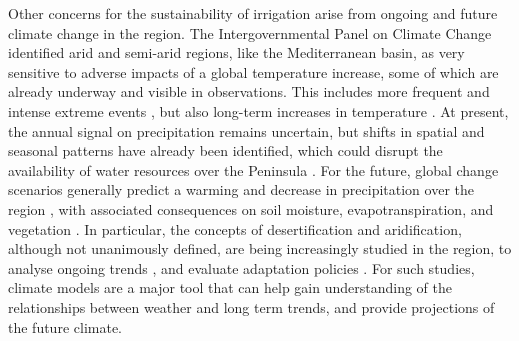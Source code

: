 Other concerns for the sustainability of irrigation arise from ongoing and future climate change in the region. The Intergovernmental Panel on Climate Change 
\citep{RN1} identified arid and semi-arid regions, like the Mediterranean basin, as very sensitive to adverse impacts of a global temperature increase, some of which are already underway and visible in observations.
This includes more frequent and intense extreme events \citep{dominguez-castro_high_2019}, but also long-term increases in temperature \citep{pena-angulo_seasonal_2021,gonzalez-hidalgo_variability_2022}. At present, the annual signal on precipitation remains uncertain, but shifts in spatial and seasonal patterns have already been identified, which could disrupt the availability of water resources over the Peninsula \citep{gonzalez-hidalgo_seasonal_2024}. 
For the future, global change scenarios generally predict a warming and decrease in precipitation over the region \citep{pereira_temperature_2021}, with associated consequences on soil moisture, evapotranspiration, and vegetation \citep{RN1, nunes_effects_2023}.
In particular, the concepts of desertification and aridification, although not unanimously defined, are being increasingly studied in the region, to analyse ongoing trends \citep{paniagua_aridity_2019, begueria_aridity_2025}, and evaluate adaptation policies \citep{van_leeuwen_evolution_2019, MITECO2022}.
For such studies, climate models are a major tool that can help gain understanding of the relationships between weather and long term trends, and provide projections of the future climate.

